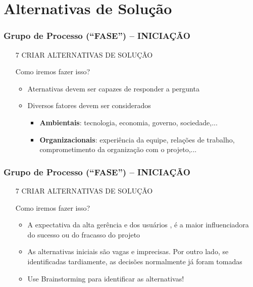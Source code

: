 \section{Alternativas de Solução}
\begin{frame}
   \frametitle{Grupo de Processo (“FASE”) – INICIAÇÃO}
   \begin{itemize}
    \item[7] CRIAR ALTERNATIVAS DE SOLUÇÃO
    \begin{block}{}
   Como iremos fazer isso?
    \end{block}

    \begin{itemize}
     \item Aternativas devem ser capazes de responder a pergunta
     \item Diversos fatores devem ser considerados
     \begin{itemize}
      \item \textbf{Ambientais}: tecnologia, economia, governo, sociedade,...
      \item \textbf{Organizacionais}: experiência da equipe, relações de trabalho, comprometimento da organização com o projeto,...
     \end{itemize}
   \end{itemize}
   \end{itemize}
\end{frame}

\begin{frame}
   \frametitle{Grupo de Processo (“FASE”) – INICIAÇÃO}
   \begin{itemize}
    \item[7] CRIAR ALTERNATIVAS DE SOLUÇÃO
    \begin{block}{}
   Como iremos fazer isso?
    \end{block}

    \begin{itemize}
     \item A expectativa da alta gerência e dos usuários , é a maior influenciadora do sucesso ou do fracasso do projeto
     \item As alternativas iniciais são vagas e imprecisas. Por outro lado, se identificadas tardiamente, as decisões normalmente já foram tomadas
     \item Use Brainstorming para identificar as alternativas!
   \end{itemize}
   \end{itemize}
\end{frame}


